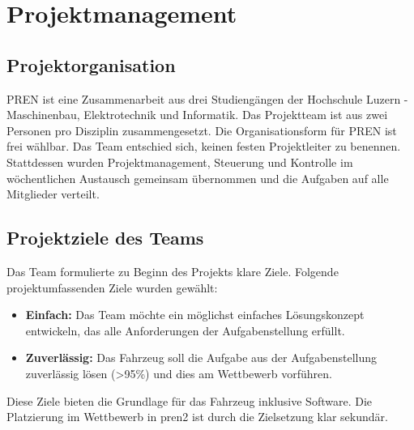 \documentclass[../main.tex]{subfiles}
\begin{document}
\newpage
\section{Projektmanagement}

\subsection {Projektorganisation}
PREN ist eine Zusammenarbeit aus drei Studiengängen der Hochschule Luzern - Maschinenbau, Elektrotechnik und Informatik. Das Projektteam ist aus zwei Personen pro Disziplin zusammengesetzt. Die Organisationsform für PREN ist frei wählbar. Das Team entschied sich, keinen festen Projektleiter zu benennen. Stattdessen wurden Projektmanagement, Steuerung und Kontrolle im wöchentlichen Austausch gemeinsam übernommen und die Aufgaben auf alle Mitglieder verteilt.

\subsection{Projektziele des Teams}
Das Team formulierte zu Beginn des Projekts klare Ziele. Folgende projektumfassenden Ziele wurden gewählt:
\begin{itemize}
\item \textbf{Einfach:} Das Team möchte ein möglichst einfaches Lösungskonzept entwickeln, das alle Anforderungen der Aufgabenstellung erfüllt.
\item \textbf{Zuverlässig:} Das Fahrzeug soll die Aufgabe aus der Aufgabenstellung zuverlässig lösen (>95\%) und dies am Wettbewerb vorführen.
\end{itemize}

Diese Ziele bieten die Grundlage für das Fahrzeug inklusive Software.
Die Platzierung im Wettbewerb in \acrshort{pren2} ist durch die Zielsetzung klar sekundär.
\end{document}
